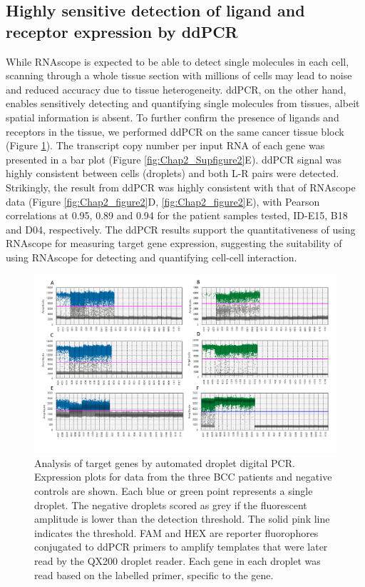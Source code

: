 \subsection{Highly sensitive detection of ligand and receptor expression by ddPCR}
While RNAscope is expected to be able to detect single molecules in each cell, scanning through a whole tissue section with millions of cells may lead to noise and reduced accuracy due to tissue heterogeneity. ddPCR, on the other hand, enables sensitively detecting and quantifying single molecules from tissues, albeit spatial information is absent. To further confirm the presence of ligands and receptors in the tissue, we performed ddPCR on the same cancer tissue block (Figure  \ref{fig:Chap2_Supfigure6}). The transcript copy number per input RNA of each gene was presented in a bar plot (Figure \ref{fig:Chap2_Supfigure2}E). ddPCR signal was highly consistent between cells (droplets) and both L-R pairs were detected. Strikingly, the result from ddPCR was highly consistent with that of RNAscope data (Figure \ref{fig:Chap2_figure2}D, \ref{fig:Chap2_figure2}E), with Pearson correlations at 0.95, 0.89 and 0.94 for the patient samples tested, ID-E15, B18 and D04, respectively. The ddPCR results support the quantitativeness of using RNAscope for measuring target gene expression, suggesting the suitability of using RNAscope for detecting and quantifying cell-cell interaction. 

\begin{figure}[htp]
\renewcommand{\figurename}{Figure}
    \centering
    \includegraphics[width=0.75\columnwidth]{Chapter2/Figures/Supplemental_Fig_S6.png}
    \caption[Analysis of target genes by automated droplet digital PCR.]{Analysis of target genes by automated droplet digital PCR. Expression plots for data from the three BCC patients and negative controls are shown. Each blue or green point represents a single droplet. The negative droplets scored as grey if the fluorescent amplitude is lower than the detection threshold. The solid pink line indicates the threshold. FAM and HEX are reporter fluorophores conjugated to ddPCR primers to amplify templates that were later read by the QX200 droplet reader. Each gene in each droplet was read based on the labelled primer, specific to the gene.}
    \label{fig:Chap2_Supfigure6}
\end{figure}


